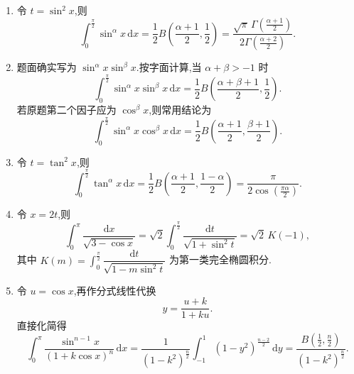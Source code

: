 \begin{solution}
    \leavevmode
    \begin{enumerate}
        \item 令 $t=\sin^2x$,则
              \[
                  \displaystyle\int_0^{\frac{\pi}{2}}\sin^\alpha x\,\mathrm{d}x
                  =\dfrac{1}{2}B\left(\dfrac{\alpha+1}{2},\dfrac{1}{2}\right)
                  =\dfrac{\sqrt\pi\,\Gamma\left(\frac{\alpha+1}{2}\right)}
                  {2\Gamma\left(\frac{\alpha+2}{2}\right)}.
              \]
        \item 题面确实写为 $\sin^\alpha x\sin^\beta x$.按字面计算,当 $\alpha+\beta>-1$ 时
              \[
                  \displaystyle\int_0^{\frac{\pi}{2}}\sin^\alpha x\sin^\beta x\,\mathrm{d}x
                  =\dfrac{1}{2}B\left(\dfrac{\alpha+\beta+1}{2},\dfrac{1}{2}\right).
              \]
              若原题第二个因子应为 $\cos^\beta x$,则常用结论为
              \[
                  \displaystyle\int_0^{\frac{\pi}{2}}\sin^\alpha x\cos^\beta x\,\mathrm{d}x
                  =\dfrac{1}{2}B\left(\dfrac{\alpha+1}{2},\dfrac{\beta+1}{2}\right).
              \]
        \item 令 $t=\tan^2x$,则
              \[
                  \displaystyle\int_0^{\frac{\pi}{2}}\tan^\alpha x\,\mathrm{d}x
                  =\dfrac{1}{2}B\left(\dfrac{\alpha+1}{2},\dfrac{1-\alpha}{2}\right)
                  =\dfrac{\pi}{2\cos\left(\frac{\pi\alpha}{2}\right)}.
              \]
        \item 令 $x=2t$,则
              \[
                  \displaystyle\int_0^\pi\dfrac{\mathrm{d}x}{\sqrt{3-\cos x}}
                  =\sqrt2\int_0^{\frac{\pi}{2}}\dfrac{\mathrm{d}t}{\sqrt{1+\sin^2t}}
                  =\sqrt2\,K(-1),
              \]
              其中 $\displaystyle K(m)=\int_0^{\frac{\pi}{2}}
                  \dfrac{\mathrm{d}t}{\sqrt{1-m\sin^2t}}$ 为第一类完全椭圆积分.
        \item 令 $u=\cos x$,再作分式线性代换
              \[
                  y=\dfrac{u+k}{1+ku}.
              \]
              直接化简得
              \[
                  \displaystyle\int_0^\pi\dfrac{\sin^{n-1}x}{(1+k\cos x)^n}\,\mathrm{d}x
                  =\dfrac{1}{(1-k^2)^{\frac{n}{2}}}
                  \int_{-1}^1(1-y^2)^{\frac{n-2}{2}}\,\mathrm{d}y
                  =\dfrac{B\left(\frac{1}{2},\frac{n}{2}\right)}{(1-k^2)^{\frac{n}{2}}}.
              \]
    \end{enumerate}
\end{solution}


